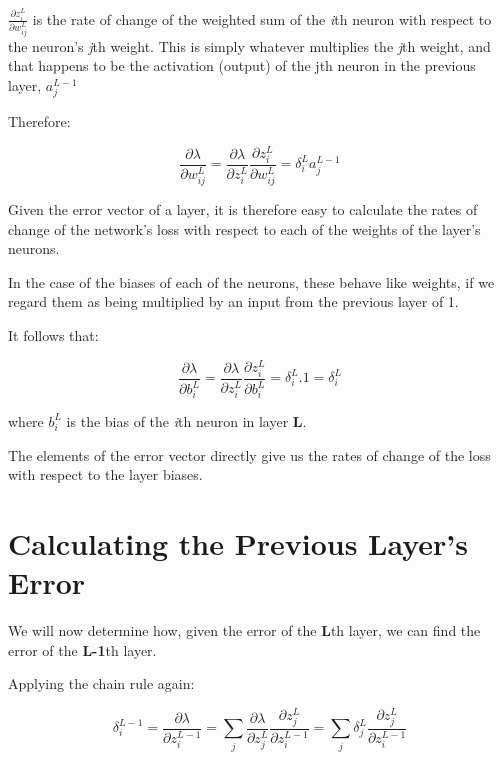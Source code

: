 \documentclass[12pt]{article}
\begin{document}
\smallskip

$\frac{\partial z^{L}_{i}}{\partial w^{L}_{ij}}$ is the rate of change of the weighted sum of the \textit{i}th neuron with respect to the neuron's \textit{j}th weight. This is simply whatever multiplies the \textit{j}th weight, and that happens to be the activation (output) of the {j}th neuron in the previous layer, $a^{L-1}_{j}$

Therefore:

\begin{equation} \label{eq:3}
\frac{\partial \lambda}{\partial w^{L}_{ij}}=\frac{\partial \lambda}{\partial z^{L}_{i}}
\frac{\partial z^{L}_{i}}{\partial w^{L}_{ij}}
=
\delta^{L}_{i} a^{L-1}_{j}
\end{equation}

Given the error vector of a layer, it is therefore easy to calculate the rates of change of the network's loss with respect to each of the weights of the layer's neurons.

In the case of the biases of each of the neurons, these behave like weights, if we regard them as being multiplied by an input from the previous layer of 1.

It follows that:

\begin{equation} \label{eq:4}
\frac{\partial \lambda}{\partial b^{L}_{i}}=\frac{\partial \lambda}{\partial z^{L}_{i}}
\frac{\partial z^{L}_{i}}{\partial b^{L}_{i}}
=
\delta^{L}_{i}. 1 =
\delta^{L}_{i}
\end{equation}

where $b^{L}_i$ is the bias of the \textit{i}th neuron in layer \textbf{L}.

The elements of the error vector directly give us the rates of change of the loss with respect to the layer biases.

\section{Calculating the Previous Layer's Error}

We will now determine how, given the error of the \textbf{L}th layer, we can find the error of the \textbf{L-1}th layer.

Applying the chain rule again:

\begin{equation} \label{eq:5}
\delta^{L-1}_{i}=\frac{\partial \lambda}{\partial z^{L-1}_i} = \sum_{j} \frac{\partial \lambda}{\partial z^{L}_j} \frac{\partial z^{L}_j}{\partial z^{L-1}_i}
=
\sum_{j} \delta^{L}_{j}\frac{\partial z^{L}_j}{\partial z^{L-1}_i}
\end{equation}
\end{document}
